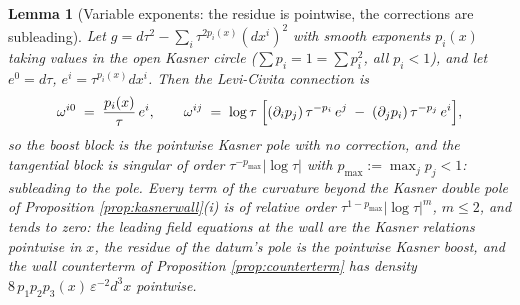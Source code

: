 \documentclass[11pt]{article}
\newtheorem{lemma}[theorem]{Lemma}
\theoremstyle{definition}
\begin{document}
\begin{lemma}[Variable exponents: the residue is pointwise, the corrections are subleading]\label{lem:varexp}
Let $g = d\tau^2 - \sum_i\tau^{2p_i(x)}(dx^i)^2$ with smooth exponents $p_i(x)$ taking values in the open Kasner circle ($\sum p_i = 1 = \sum p_i^2$, all $p_i < 1$), and let $e^0 = d\tau$, $e^i = \tau^{p_i(x)}dx^i$. Then the Levi-Civita connection is
\[
\omega^{i0} \;=\; \frac{p_i(x)}{\tau}\,e^i, \qquad
\omega^{ij} \;=\; \log\tau\;\Bigl[(\partial_i p_j)\,\tau^{-p_i}\,e^j \;-\; (\partial_j p_i)\,\tau^{-p_j}\,e^i\Bigr] ,
\]
so the boost block is the pointwise Kasner pole with no correction, and the tangential block is singular of order $\tau^{-p_{\max}}|\log\tau|$ with $p_{\max} := \max_j p_j < 1$: subleading to the pole. Every term of the curvature beyond the Kasner double pole of Proposition \ref{prop:kasnerwall}(i) is of relative order $\tau^{1-p_{\max}}|\log\tau|^m$, $m \leq 2$, and tends to zero: the leading field equations at the wall are the Kasner relations pointwise in $x$, the residue of the datum's pole is the pointwise Kasner boost, and the wall counterterm of Proposition \ref{prop:counterterm} has density $8\,p_1p_2p_3(x)\,\varepsilon^{-2}d^3x$ pointwise.
\end{lemma}
\end{document}
